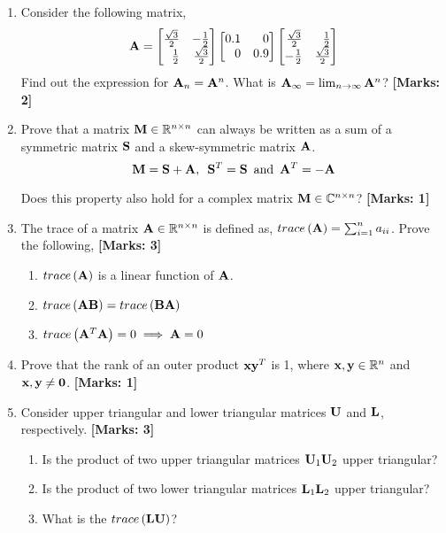 \documentclass[12pt]{article}
\def\mf{\ensuremath\mathbf}
\def\mb{\ensuremath\mathbb}
\def\lp{\ensuremath\left(}
\def\rp{\ensuremath\right)}
\def\bmx{\ensuremath\begin{bmatrix*}[r]}
\def\emx{\ensuremath\end{bmatrix*}}
\begin{document}
\begin{enumerate}
    \item Consider the following matrix,
    \[ \mf{A} = \bmx \frac{\sqrt{3}}{2} & -\frac{1}{2}\\\frac{1}{2} & \frac{\sqrt{3}}{2} \emx \bmx 0.1 & 0\\0 & 0.9 \emx \bmx \frac{\sqrt{3}}{2} & \frac{1}{2}\\-\frac{1}{2} & \frac{\sqrt{3}}{2} \emx \]
    Find out the expression for $\mf{A}_n = \mf{A}^n$. What is $\mf{A}_\infty = \lim_{n\to\infty} \mf{A}^n$?  \textbf{[Marks: 2]}

    \item Prove that a matrix $\mf{M} \in \mathbb{R}^{n \times n}$ can always be written as a sum of a symmetric matrix $\mf{S}$ and a skew-symmetric matrix $\mf{A}$.
    \[ \mf{M} = \mf{S} + \mf{A}, \,\,\, \mf{S}^T = \mf{S} \, \text{ and } \, \mf{A}^T = -\mf{A} \]

    Does this property also hold for a complex matrix $\mf{M} \in \mb{C}^{n \times n}$?  \textbf{[Marks: 1]}

    \item The trace of a matrix $\mf{A} \in \mb{R}^{n \times n}$ is defined as, $trace\left(\mf{A}\right) = \sum_{i=1}^{n}a_{ii}$. Prove the following,  \textbf{[Marks: 3]}
    \begin{enumerate}
        \item $trace\left(\mf{A}\right)$ is a linear function of $\mf{A}$.
        \item $trace\left(\mf{AB}\right) = trace\left(\mf{BA}\right)$
        \item $trace\left(\mf{A}^T\mf{A}\right) = 0 \implies \mf{A} = 0$
    \end{enumerate}

    \item Prove that the rank of an outer product $\mf{x}\mf{y}^T$ is 1, where $\mf{x},\mf{y} \in \mb{R}^n$ and $\mf{x}, \mf{y} \neq \mf{0}$.  \textbf{[Marks: 1]}


    \item Consider upper triangular and lower triangular matrices $\mf{U}$ and $\mf{L}$, respectively.   \textbf{[Marks: 3]}
    \begin{enumerate}
        \item Is the product of two upper triangular matrices $\mf{U}_1\mf{U}_2$ upper triangular?
        \item Is the product of two lower triangular matrices $\mf{L}_1\mf{L}_2$ upper triangular?
        \item What is the $trace\lp \mf{L}\mf{U} \rp$?
    \end{enumerate}


\end{enumerate}
\end{document}
